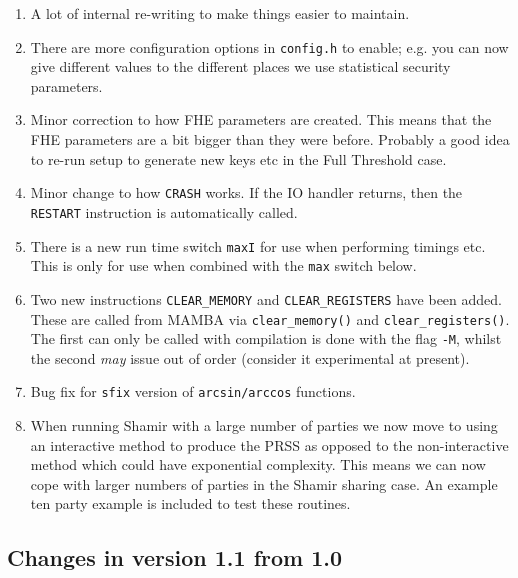 \begin{enumerate}
\item A lot of internal re-writing to make things easier to maintain.
\item There are more configuration options in \verb+config.h+ to enable;
      e.g. you can now give different values to the different places
      we use statistical security parameters.
\item Minor correction to how FHE parameters are created. This means
      that the FHE parameters are a bit bigger than they were before.
      Probably a good idea to re-run setup to generate new keys etc
      in the Full Threshold case.
\item Minor change to how \verb+CRASH+ works. If the IO handler returns,
      then the \verb+RESTART+ instruction is automatically called.
\item There is a new run time switch \verb+maxI+ for use when performing
      timings etc. This is only for use when combined with the \verb+max+
      switch below.
\item Two new instructions \verb+CLEAR_MEMORY+ and \verb+CLEAR_REGISTERS+
      have been added.
      These are called from MAMBA via \verb+clear_memory()+ and \verb+clear_registers()+.
      The first can only be called with compilation is done with the flag \verb+-M+, whilst
      the second {\em may} issue out of order (consider it experimental at present).
\item Bug fix for \verb+sfix+ version of \verb+arcsin/arccos+ functions.
\item When running Shamir with a large number of parties we now move to using
      an interactive method to produce the PRSS as opposed to the non-interactive
      method which could have exponential complexity. This means we can now cope
      with larger numbers of parties in the Shamir sharing case. An example
      ten party example is included to test these routines.
\end{enumerate}


\subsection{Changes in version 1.1 from 1.0}

